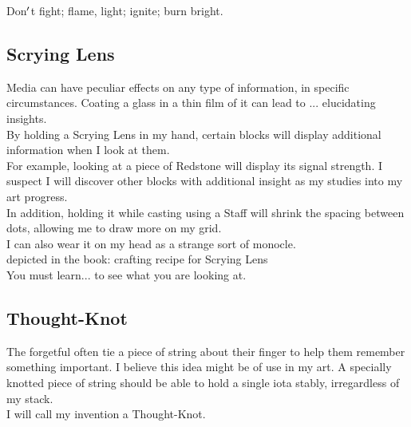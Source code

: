 \documentclass[12pt]{article}
\begin{document}
      Don$\rq$t fight; flame, light; ignite; burn bright.\\


\newpage

\label{sec:items/lens}
\subsection*{Scrying Lens}


  
    Media can have peculiar effects on any type of information, in specific circumstances. Coating a glass in a thin film of it can lead to ... elucidating insights.\\By holding a Scrying Lens in my hand, certain blocks will display additional information when I look at them.\\


  
    For example, looking at a piece of Redstone will display its signal strength. I suspect I will discover other blocks with additional insight as my studies into my art progress.\\In addition, holding it while casting using a Staff will shrink the spacing between dots, allowing me to draw more on my grid.\\I can also wear it on my head as a strange sort of monocle.\\


  
  depicted in the book: crafting recipe for 
    Scrying Lens
\\

      You must learn... to see what you are looking at.\\


\newpage

\label{sec:items/thought_knot}
\subsection*{Thought-Knot}


  
    The forgetful often tie a piece of string about their finger to help them remember something important. I believe this idea might be of use in my art. A specially knotted piece of string should be able to hold a single iota stably, irregardless of my stack.\\I will call my invention a Thought-Knot.\\
\end{document}
